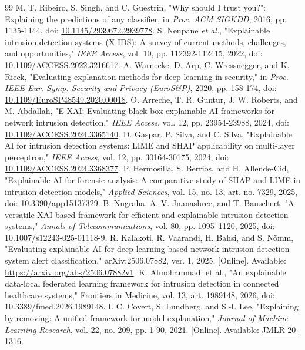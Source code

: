 \documentclass[conference,letterpaper]{IEEEtran}
\begin{document}
\begin{thebibliography}{99}
 M. T. Ribeiro, S. Singh, and C. Guestrin, "Why should I trust you?": Explaining the predictions of any classifier, in \emph{Proc. ACM SIGKDD}, 2016, pp. 1135-1144, doi: \href{https://doi.org/10.1145/2939672.2939778}{10.1145/2939672.2939778}.
 S. Neupane \emph{et al.}, "Explainable intrusion detection systems (X-IDS): A survey of current methods, challenges, and opportunities," \emph{IEEE Access}, vol. 10, pp. 112392-112415, 2022, doi: \href{https://doi.org/10.1109/ACCESS.2022.3216617}{10.1109/ACCESS.2022.3216617}.
 A. Warnecke, D. Arp, C. Wressnegger, and K. Rieck, "Evaluating explanation methods for deep learning in security," in \emph{Proc. IEEE Eur. Symp. Security and Privacy (EuroS\&P)}, 2020, pp. 158-174, doi: \href{https://doi.org/10.1109/EuroSP48549.2020.00018}{10.1109/EuroSP48549.2020.00018}.
 O. Arreche, T. R. Guntur, J. W. Roberts, and M. Abdallah, "E-XAI: Evaluating black-box explainable AI frameworks for network intrusion detection," \emph{IEEE Access}, vol. 12, pp. 23954-23988, 2024, doi: \href{https://doi.org/10.1109/ACCESS.2024.3365140}{10.1109/ACCESS.2024.3365140}.
 D. Gaspar, P. Silva, and C. Silva, "Explainable AI for intrusion detection systems: LIME and SHAP applicability on multi-layer perceptron," \emph{IEEE Access}, vol. 12, pp. 30164-30175, 2024, doi: \href{https://doi.org/10.1109/ACCESS.2024.3368377}{10.1109/ACCESS.2024.3368377}.
 P. Hermosilla, S. Berrios, and H. Allende-Cid, "Explainable AI for forensic analysis: A comparative study of SHAP and LIME in intrusion detection models," \emph{Applied Sciences}, vol. 15, no. 13, art. no. 7329, 2025, doi: 10.3390/app15137329.
 B. Nugraha, A. V. Jnanashree, and T. Bauschert, "A versatile XAI-based framework for efficient and explainable intrusion detection systems," \emph{Annals of Telecommunications}, vol. 80, pp. 1095--1120, 2025, doi: 10.1007/s12243-025-01118-9.
 R. Kalakoti, R. Vaarandi, H. Bahsi, and S. N\~omm, "Evaluating explainable AI for deep learning-based network intrusion detection system alert classification," arXiv:2506.07882, ver. 1, 2025. [Online]. Available: \url{https://arxiv.org/abs/2506.07882v1}.
 K. Almohammadi et al., "An explainable data-local federated learning framework for intrusion detection in connected healthcare systems," Frontiers in Medicine, vol. 13, art. 1989148, 2026, doi: 10.3389/fmed.2026.1989148.
 I. C. Covert, S. Lundberg, and S.-I. Lee, "Explaining by removing: A unified framework for model explanation," \emph{Journal of Machine Learning Research}, vol. 22, no. 209, pp. 1-90, 2021. [Online]. Available: \href{https://jmlr.org/papers/v22/20-1316.html}{JMLR 20-1316}.

\end{thebibliography}
\end{document}

